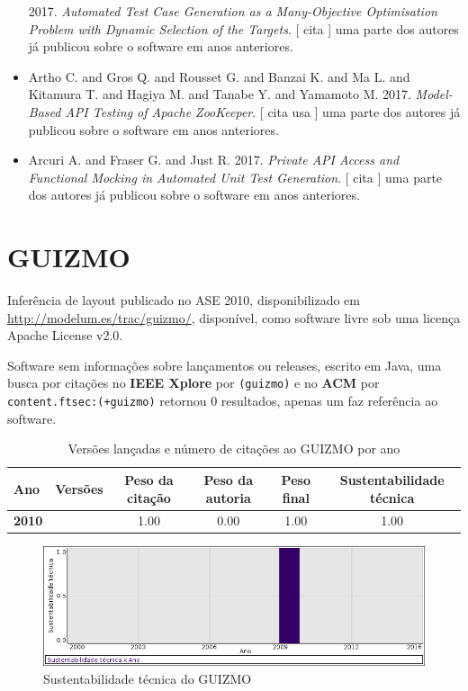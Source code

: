 \begin{itemize}
      2017.
        \textit{ Automated Test Case Generation as a Many-Objective Optimisation Problem with Dynamic Selection of the Targets}.
      [
          cita
      ]
uma parte dos autores já publicou sobre o software em anos anteriores.
\item Artho C. and Gros Q. and Rousset G. and Banzai K. and Ma L. and Kitamura T. and Hagiya M. and Tanabe Y. and Yamamoto M.
      2017.
        \textit{ Model-Based API Testing of Apache ZooKeeper}.
      [
          cita
          usa
      ]
uma parte dos autores já publicou sobre o software em anos anteriores.
\item Arcuri A. and Fraser G. and Just R.
      2017.
        \textit{ Private API Access and Functional Mocking in Automated Unit Test Generation}.
      [
          cita
      ]
uma parte dos autores já publicou sobre o software em anos anteriores.
\end{itemize}
\section{GUIZMO}

Inferência de layout
publicado no ASE 2010,
disponibilizado em \url{http://modelum.es/trac/guizmo/},
disponível,
como software livre
sob uma licença Apache License v2.0.

Software sem informações sobre lançamentos ou releases,
escrito em Java,
uma busca por citações no {\bf IEEE Xplore} por
\texttt{(guizmo)}
e no {\bf ACM} por
\texttt{content.ftsec:(+guizmo)}
retornou
0 resultados,
apenas um faz referência ao software.


\begin{table}[H]
\caption{Versões lançadas e número de citações ao GUIZMO por ano}
\centering
\begin{tabular}{| l | c | c | c | c | c |}
  \hline
  Ano & Versões & Peso da citação & Peso da autoria & Peso final & Sustentabilidade técnica \\
  \hline
            {\bf 2010}
          &
          
          &
          1.00
          &
          0.00
          &
          1.00
          &
            {\color{blue} 1.00}
          \\
\hline
\end{tabular}
\end{table}

\begin{figure}[h]
  \center
  \includegraphics[scale=0.50]{result-documents/charts/guizmo.png}
  \caption{Sustentabilidade técnica do GUIZMO}
\end{figure}


